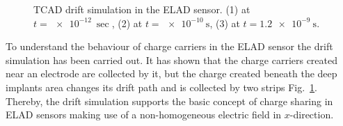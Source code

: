 \begin{figure}[t]
\begin{minipage}[h]{0.24\linewidth}
 \end{minipage}
 \begin{minipage}[h]{0.24\linewidth}
 \end{minipage}
\caption[short description here]
  {TCAD drift simulation in the ELAD sensor. (1) at $t = \SI{e-12}{\sec}$, (2) at $t = \SI{e-10}{\s}$, (3) at $t = \SI{1.2e-9}{\s}$.}
\label{fig:drift}
\end{figure} %

To understand the behaviour of charge carriers in the ELAD sensor the drift simulation has been carried out. 
It has shown that the charge carriers created near an electrode are collected by it, but the charge created beneath the deep implants area %
 changes its drift path and is collected by two strips Fig.~\ref{fig:drift}.  
Thereby, the drift simulation supports the basic concept of charge sharing in ELAD sensors making use of a non-homogeneous electric field in $x$-direction. 


 
